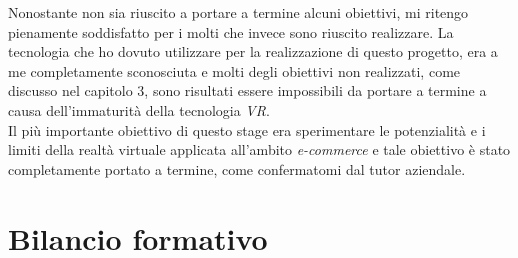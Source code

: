 Nonostante non sia riuscito a portare a termine alcuni obiettivi, mi ritengo pienamente soddisfatto per i molti che invece sono riuscito realizzare. La tecnologia che ho dovuto utilizzare per la realizzazione di questo progetto, era a me completamente sconosciuta e molti degli obiettivi non realizzati, come discusso nel capitolo 3, sono risultati essere impossibili da portare a termine a causa dell'immaturità della tecnologia \textit{VR}. \\ 
Il più importante obiettivo di questo stage era sperimentare le potenzialità e i limiti della realtà virtuale applicata all'ambito \textit{e-commerce} e tale obiettivo è stato completamente portato a termine, come confermatomi dal tutor aziendale.

\section{Bilancio formativo}

